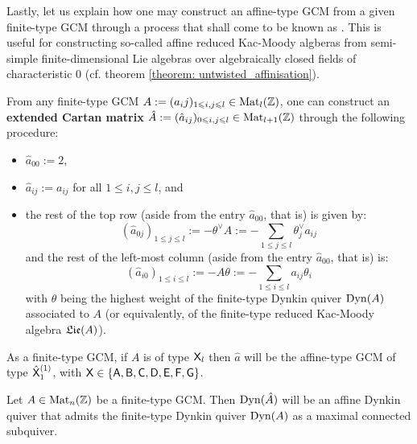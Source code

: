             Lastly, let us explain how one may construct an affine-type GCM from a given finite-type GCM through a process that shall come to be known as . This is useful for constructing so-called  affine reduced Kac-Moody algberas from semi-simple finite-dimensional Lie algebras over algebraically closed fields of characteristic $0$ (cf. theorem \ref{theorem: untwisted_affinisation}). 
            \begin{definition} \label{def: extended_cartan_matrices}
                From any finite-type GCM $A := (a_ij)_{1 \leqslant i, j \leqslant l} \in \mathrm{Mat}_l(\mathbb{Z})$, one can construct an \textbf{extended Cartan matrix} $\hat{A} := (\hat{a}_{ij})_{0 \leqslant i, j \leqslant l} \in \mathrm{Mat}_{l + 1}(\mathbb{Z})$ through the following procedure:
                    \begin{itemize}
                        \item $\hat{a}_{00} := 2$,
                        \item $\hat{a}_{ij} := a_{ij}$ for all $1 \leq i, j \leq l$, and
                        \item the rest of the top row (aside from the entry $\hat{a}_{00}$, that is) is given by:
                            $$(\hat{a}_{0j})_{1 \leq j \leq l} := -\theta^{\vee} A := -\sum_{1 \leq j \leq l} \theta_j^{\vee} a_{ij}$$
                        and the rest of the left-most column (aside from the entry $\hat{a}_{00}$, that is) is:
                            $$(\hat{a}_{i0})_{1 \leq i \leq l} := - A \theta := -\sum_{1 \leq i \leq l} a_{ij} \theta_i$$
                        with $\theta$ being the highest weight of the finite-type Dynkin quiver $\mathrm{Dyn}(A)$ associated to $A$ (or equivalently, of the finite-type reduced Kac-Moody algebra $\mathfrak{Lie}(A)$).
                    \end{itemize}
            \end{definition}
            \begin{lemma} \label{lemma: extended_cartan_matrices_are_affine_generalised_cartan_matrices}
                \cite[Proposition 18.1]{carter_affine_lie_algebras} As a finite-type GCM, if $A$ is of type $\mathsf{X}_l$ then $\hat{a}$ will be the affine-type GCM of type $\hat{\mathsf{X}}_1^{(1)}$, with $\mathsf{X} \in \{\mathsf{A}, \mathsf{B}, \mathsf{C}, \mathsf{D}, \mathsf{E}, \mathsf{F}, \mathsf{G}\}$.
            \end{lemma}
            \begin{corollary} \label{coro: dynkin_quivers_of_tame_generalised_cartan_matrices}
                Let $A \in \mathrm{Mat}_n(\mathbb{Z})$ be a finite-type GCM. Then $\mathrm{Dyn}(\hat{A})$ will be an affine Dynkin quiver that admits the finite-type Dynkin quiver $\mathrm{Dyn}(A)$ as a maximal connected subquiver.
            \end{corollary}
